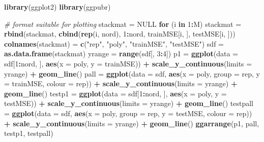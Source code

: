 \documentclass[]{article}
\newenvironment{Shaded}{\begin{snugshade}}{\end{snugshade}}
\newcommand{\KeywordTok}[1]{\textcolor[rgb]{0.13,0.29,0.53}{\textbf{#1}}}
\newcommand{\DataTypeTok}[1]{\textcolor[rgb]{0.13,0.29,0.53}{#1}}
\newcommand{\DecValTok}[1]{\textcolor[rgb]{0.00,0.00,0.81}{#1}}
\newcommand{\StringTok}[1]{\textcolor[rgb]{0.31,0.60,0.02}{#1}}
\newcommand{\CommentTok}[1]{\textcolor[rgb]{0.56,0.35,0.01}{\textit{#1}}}
\newcommand{\OtherTok}[1]{\textcolor[rgb]{0.56,0.35,0.01}{#1}}
\newcommand{\ControlFlowTok}[1]{\textcolor[rgb]{0.13,0.29,0.53}{\textbf{#1}}}
\newcommand{\OperatorTok}[1]{\textcolor[rgb]{0.81,0.36,0.00}{\textbf{#1}}}
\newcommand{\NormalTok}[1]{#1}
\begin{document}
\begin{Shaded}
\begin{Highlighting}[]
\KeywordTok{library}\NormalTok{(ggplot2)}
\KeywordTok{library}\NormalTok{(ggpubr)}

\CommentTok{# format suitable for plotting}
\NormalTok{stackmat =}\StringTok{ }\OtherTok{NULL}
\ControlFlowTok{for}\NormalTok{ (i }\ControlFlowTok{in} \DecValTok{1}\OperatorTok{:}\NormalTok{M) stackmat =}\StringTok{ }\KeywordTok{rbind}\NormalTok{(stackmat, }\KeywordTok{cbind}\NormalTok{(}\KeywordTok{rep}\NormalTok{(i, nord), }\DecValTok{1}\OperatorTok{:}\NormalTok{nord, }
\NormalTok{    trainMSE[i, ], testMSE[i, ]))}
\KeywordTok{colnames}\NormalTok{(stackmat) =}\StringTok{ }\KeywordTok{c}\NormalTok{(}\StringTok{"rep"}\NormalTok{, }\StringTok{"poly"}\NormalTok{, }\StringTok{"trainMSE"}\NormalTok{, }\StringTok{"testMSE"}\NormalTok{)}
\NormalTok{sdf =}\StringTok{ }\KeywordTok{as.data.frame}\NormalTok{(stackmat)}
\NormalTok{yrange =}\StringTok{ }\KeywordTok{range}\NormalTok{(sdf[, }\DecValTok{3}\OperatorTok{:}\DecValTok{4}\NormalTok{])}
\NormalTok{p1 =}\StringTok{ }\KeywordTok{ggplot}\NormalTok{(}\DataTypeTok{data =}\NormalTok{ sdf[}\DecValTok{1}\OperatorTok{:}\NormalTok{nord, ], }\KeywordTok{aes}\NormalTok{(}\DataTypeTok{x =}\NormalTok{ poly, }\DataTypeTok{y =}\NormalTok{ trainMSE)) }\OperatorTok{+}\StringTok{ }\KeywordTok{scale_y_continuous}\NormalTok{(}\DataTypeTok{limits =}\NormalTok{ yrange) }\OperatorTok{+}\StringTok{ }
\StringTok{    }\KeywordTok{geom_line}\NormalTok{()}
\NormalTok{pall =}\StringTok{ }\KeywordTok{ggplot}\NormalTok{(}\DataTypeTok{data =}\NormalTok{ sdf, }\KeywordTok{aes}\NormalTok{(}\DataTypeTok{x =}\NormalTok{ poly, }\DataTypeTok{group =}\NormalTok{ rep, }\DataTypeTok{y =}\NormalTok{ trainMSE, }\DataTypeTok{colour =}\NormalTok{ rep)) }\OperatorTok{+}\StringTok{ }
\StringTok{    }\KeywordTok{scale_y_continuous}\NormalTok{(}\DataTypeTok{limits =}\NormalTok{ yrange) }\OperatorTok{+}\StringTok{ }\KeywordTok{geom_line}\NormalTok{()}
\NormalTok{testp1 =}\StringTok{ }\KeywordTok{ggplot}\NormalTok{(}\DataTypeTok{data =}\NormalTok{ sdf[}\DecValTok{1}\OperatorTok{:}\NormalTok{nord, ], }\KeywordTok{aes}\NormalTok{(}\DataTypeTok{x =}\NormalTok{ poly, }\DataTypeTok{y =}\NormalTok{ testMSE)) }\OperatorTok{+}\StringTok{ }\KeywordTok{scale_y_continuous}\NormalTok{(}\DataTypeTok{limits =}\NormalTok{ yrange) }\OperatorTok{+}\StringTok{ }
\StringTok{    }\KeywordTok{geom_line}\NormalTok{()}
\NormalTok{testpall =}\StringTok{ }\KeywordTok{ggplot}\NormalTok{(}\DataTypeTok{data =}\NormalTok{ sdf, }\KeywordTok{aes}\NormalTok{(}\DataTypeTok{x =}\NormalTok{ poly, }\DataTypeTok{group =}\NormalTok{ rep, }\DataTypeTok{y =}\NormalTok{ testMSE, }
    \DataTypeTok{colour =}\NormalTok{ rep)) }\OperatorTok{+}\StringTok{ }\KeywordTok{scale_y_continuous}\NormalTok{(}\DataTypeTok{limits =}\NormalTok{ yrange) }\OperatorTok{+}\StringTok{ }\KeywordTok{geom_line}\NormalTok{()}
\KeywordTok{ggarrange}\NormalTok{(p1, pall, testp1, testpall)}
\end{Highlighting}
\end{Shaded}
\end{document}
